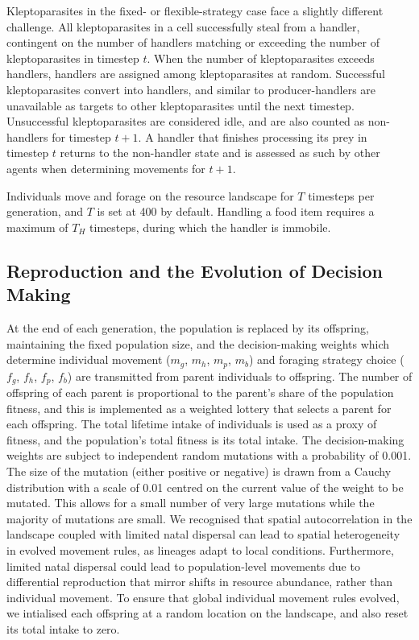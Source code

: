 \documentclass[11pt]{article}
\begin{document}
Kleptoparasites in the fixed- or flexible-strategy case face a slightly different challenge.
All kleptoparasites in a cell successfully steal from a handler, contingent on the number of handlers matching or exceeding the number of kleptoparasites in timestep $t$.
When the number of kleptoparasites exceeds handlers, handlers are assigned among kleptoparasites at random.
Successful kleptoparasites convert into handlers, and similar to producer-handlers are unavailable as targets to other kleptoparasites until the next timestep.
Unsuccessful kleptoparasites are considered idle, and are also counted as non-handlers for timestep $t+1$.
A handler that finishes processing its prey in timestep $t$ returns to the non-handler state and is assessed as such by other agents when determining movements for $t+1$.

Individuals move and forage on the resource landscape for $T$ timesteps per generation, and $T$ is set at 400 by default.
Handling a food item requires a maximum of $T_H$ timesteps, during which the handler is immobile.

\subsection{Reproduction and the Evolution of Decision Making}

At the end of each generation, the population is replaced by its offspring, maintaining the fixed population size, and the decision-making weights which determine individual movement ($m_g$, $m_h$, $m_p$, $m_b$) and foraging strategy choice ($f_g$, $f_h$, $f_p$, $f_b$) are transmitted from parent individuals to offspring.
The number of offspring of each parent is proportional to the parent's share of the population fitness, and this is implemented as a weighted lottery that selects a parent for each offspring.
The total lifetime intake of individuals is used as a proxy of fitness, and the population's total fitness is its total intake.
The decision-making weights are subject to independent random mutations with a probability of 0.001.
The size of the mutation (either positive or negative) is drawn from a Cauchy distribution with a scale of 0.01 centred on the current value of the weight to be mutated.
This allows for a small number of very large mutations while the majority of mutations are small.
We recognised that spatial autocorrelation in the landscape coupled with limited natal dispersal can lead to spatial heterogeneity in evolved movement rules, as lineages adapt to local conditions.
Furthermore, limited natal dispersal could lead to population-level movements due to differential reproduction that mirror shifts in resource abundance, rather than individual movement.
To ensure that global individual movement rules evolved, we intialised each offspring at a random location on the landscape, and also reset its total intake to zero.
\end{document}
